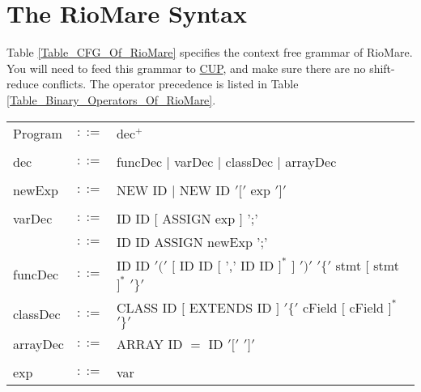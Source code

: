 \documentclass{article}
\begin{document}
\section{The RioMare Syntax}
Table \ref{Table_CFG_Of_RioMare} specifies the context free grammar of RioMare.
You will need to feed this grammar to \href{http://www2.cs.tum.edu/projects/cup/}{CUP},
and make sure there are no shift-reduce conflicts.
The operator precedence is listed in Table
\ref{Table_Binary_Operators_Of_RioMare}. 
\begin{table}[h]
\centering
\begin{tabular}{ l c l }
Program  & $::=$ & dec$^{+}$ \\
\\
dec      & $::=$ & funcDec $|$ varDec $|$ classDec $|$ arrayDec \\
\\
newExp   & $::=$ & NEW ID $|$ NEW ID $'['$ exp $']'$ \\
\\
varDec   & $::=$ & ID ID $[$ ASSIGN exp $]$ ';' \\
         & $::=$ & ID ID ASSIGN newExp ';'      \\
funcDec  & $::=$ & ID ID $'('$ $[$ ID ID $[$ ',' ID ID $]^{*}$ $]$ $')'$ %
                   $'\{'$ stmt   $[$ stmt $]^{*}$ $'\}'$                 \\
classDec & $::=$ & CLASS ID $[$ EXTENDS ID $]$ $'\{'$ cField $[$ cField $]^{*}$ $'\}'$ \\
arrayDec & $::=$ & ARRAY ID $=$ ID $'['$ $']'$ \\
\\
exp      & $::=$ & var                                                            \\

\end{tabular}
\end{table}
\end{document}
